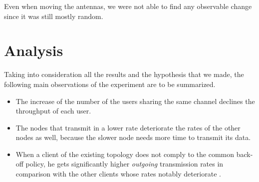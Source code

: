 \documentclass[12pt,a4paper]{article}
\begin{document}
Even when moving the antennas, we were not able to find any observable change since it was still mostly random.
\section{Analysis}
Taking into consideration all the results and the hypothesis that we made, the following main observations of the experiment are to be summarized.
\begin{itemize}
\item The increase of the number of the users sharing the same channel declines the throughput of each user.

\item The nodes that transmit in a lower rate deteriorate the rates of the other nodes as well, because the slower node needs more time to transmit its data.

\item When a client of the existing topology does not comply to the common back-off policy, he gets significantly higher \emph{outgoing} transmission rates in comparison with the other clients whose rates notably deteriorate . 
\end{itemize}



\end{document}
